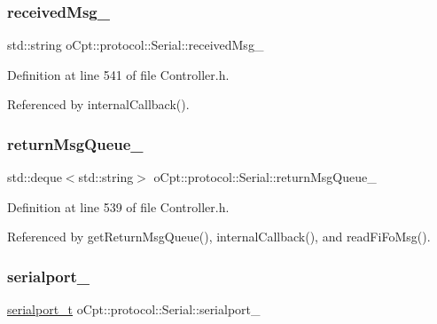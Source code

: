 \subsubsection{\texorpdfstring{received\+Msg\+\_\+}{receivedMsg\_}}
{\footnotesize\ttfamily std\+::string o\+Cpt\+::protocol\+::\+Serial\+::received\+Msg\+\_\+\hspace{0.3cm}{\ttfamily [protected]}}



Definition at line 541 of file Controller.\+h.



Referenced by internal\+Callback().

\hypertarget{classo_cpt_1_1protocol_1_1_serial_aeed234980f18b4b66f8c88c50d6188f8}{}\label{classo_cpt_1_1protocol_1_1_serial_aeed234980f18b4b66f8c88c50d6188f8} 
\subsubsection{\texorpdfstring{return\+Msg\+Queue\+\_\+}{returnMsgQueue\_}}
{\footnotesize\ttfamily std\+::deque$<$std\+::string$>$ o\+Cpt\+::protocol\+::\+Serial\+::return\+Msg\+Queue\+\_\+\hspace{0.3cm}{\ttfamily [protected]}}



Definition at line 539 of file Controller.\+h.



Referenced by get\+Return\+Msg\+Queue(), internal\+Callback(), and read\+Fi\+Fo\+Msg().

\hypertarget{classo_cpt_1_1protocol_1_1_serial_a3297de5a49ff3956439fcd5c030c75a0}{}\label{classo_cpt_1_1protocol_1_1_serial_a3297de5a49ff3956439fcd5c030c75a0} 
\subsubsection{\texorpdfstring{serialport\+\_\+}{serialport\_}}
{\footnotesize\ttfamily \hyperlink{classo_cpt_1_1protocol_1_1_serial_a3949fae08041279672bcb29b94d4cd52}{serialport\+\_\+t} o\+Cpt\+::protocol\+::\+Serial\+::serialport\+\_\+\hspace{0.3cm}{\ttfamily [protected]}}




